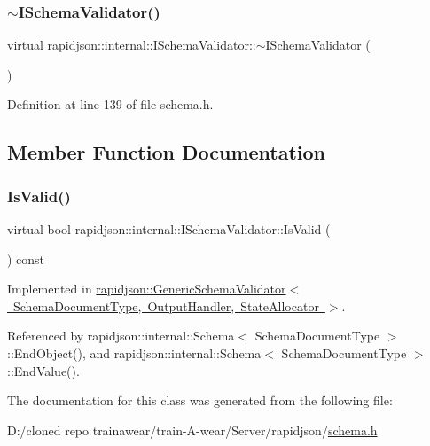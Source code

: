 \subsubsection{\texorpdfstring{$\sim$ISchemaValidator()}{~ISchemaValidator()}}
{\footnotesize\ttfamily virtual rapidjson\+::internal\+::\+I\+Schema\+Validator\+::$\sim$\+I\+Schema\+Validator (\begin{DoxyParamCaption}{ }\end{DoxyParamCaption})\hspace{0.3cm}{\ttfamily [virtual]}}



Definition at line 139 of file schema.\+h.


\begin{DoxyCode}{0}

\end{DoxyCode}


\subsection{Member Function Documentation}
\mbox{\label{classrapidjson_1_1internal_1_1_i_schema_validator_a5746528d0c29832b748855896ef2bcc8}} 
\subsubsection{\texorpdfstring{IsValid()}{IsValid()}}
{\footnotesize\ttfamily virtual bool rapidjson\+::internal\+::\+I\+Schema\+Validator\+::\+Is\+Valid (\begin{DoxyParamCaption}{ }\end{DoxyParamCaption}) const\hspace{0.3cm}{\ttfamily [pure virtual]}}



Implemented in \mbox{\hyperlink{classrapidjson_1_1_generic_schema_validator_ad32a9ad31dbb588edaaf038ab053275b}{rapidjson\+::\+Generic\+Schema\+Validator$<$ Schema\+Document\+Type, Output\+Handler, State\+Allocator $>$}}.



Referenced by rapidjson\+::internal\+::\+Schema$<$ Schema\+Document\+Type $>$\+::\+End\+Object(), and rapidjson\+::internal\+::\+Schema$<$ Schema\+Document\+Type $>$\+::\+End\+Value().



The documentation for this class was generated from the following file\+:\begin{DoxyCompactItemize}
\item 
D\+:/cloned repo trainawear/train-\/\+A-\/wear/\+Server/rapidjson/\mbox{\hyperlink{schema_8h}{schema.\+h}}\end{DoxyCompactItemize}
